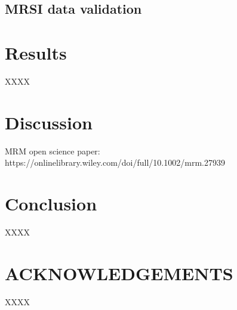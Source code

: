 \documentclass[num-refs]{wiley-article}
\begin{document}
\subsection{MRSI data validation}

\section{Results}
XXXX

\section{Discussion}
MRM open science paper: https://onlinelibrary.wiley.com/doi/full/10.1002/mrm.27939

\cite{Stikov2019}


\cite{OSullivan1986}



\section{Conclusion}
XXXX

\section*{ACKNOWLEDGEMENTS}
XXXX



\clearpage
\listoffigures
\end{document}
